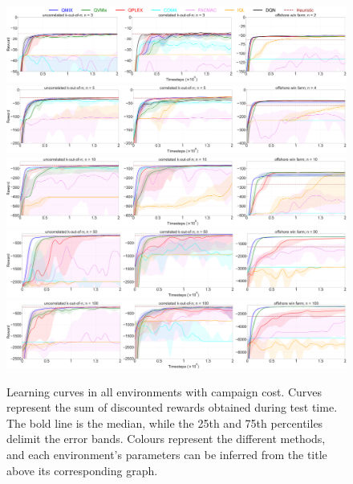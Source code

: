 \begin{figure}
\includegraphics[width=\textwidth]{tex_thesis/figures/ch5/all_3_cc_True.pdf}
\includegraphics[width=\textwidth]{tex_thesis/figures/ch5/all_5_cc_True.pdf}
\includegraphics[width=\textwidth]{tex_thesis/figures/ch5/all_10_cc_True.pdf}
\includegraphics[width=\textwidth]{tex_thesis/figures/ch5/all_50_cc_True.pdf}
\includegraphics[width=\textwidth]{tex_thesis/figures/ch5/all_100_cc_True.pdf}
\caption{
Learning curves in all environments with campaign cost. 
Curves represent the sum of discounted rewards obtained during test time.
The bold line is the median, while the 25th and 75th percentiles delimit the error bands.
Colours represent the different methods, and each environment's parameters can be inferred from the title above its corresponding graph.
}
\label{fig:learning_curves_cc_true}
\end{figure}

